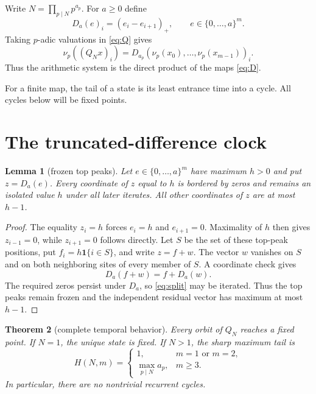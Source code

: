 \documentclass[a4paper,11pt]{amsart}
\newtheorem{theorem}{Theorem}[section]
\newtheorem{lemma}[theorem]{Lemma}
\theoremstyle{remark}
\begin{document}
Write $N=\prod_{p\mid N}p^{a_p}$.  For $a\geq0$ define
\begin{equation}\label{eq:D}
 D_a(e)_i=(e_i-e_{i+1})_+,
 \qquad e\in\{0,\ldots,a\}^m.
\end{equation}
Taking $p$-adic valuations in \eqref{eq:Q} gives
\begin{equation}\label{eq:conjugacy}
 \nu_p((Q_Nx)_i)=D_{a_p}(\nu_p(x_0),\ldots,\nu_p(x_{m-1}))_i.
\end{equation}
Thus the arithmetic system is the direct product of the maps \eqref{eq:D}.

For a finite map, the tail of a state is its least entrance time into a
cycle.  All cycles below will be fixed points.

\section{The truncated-difference clock}

\begin{lemma}[frozen top peaks]\label{lem:peaks}
Let $e\in\{0,\ldots,a\}^m$ have maximum $h>0$ and put $z=D_a(e)$.
Every coordinate of $z$ equal to $h$ is bordered by zeros and remains an
isolated value $h$ under all later iterates.  All other coordinates of $z$
are at most $h-1$.
\end{lemma}

\begin{proof}
The equality $z_i=h$ forces $e_i=h$ and $e_{i+1}=0$.  Maximality of $h$
then gives $z_{i-1}=0$, while $z_{i+1}=0$ follows directly.  Let $S$ be the
set of these top-peak positions, put $f_i=h\mathbf1\{i\in S\}$, and write
$z=f+w$.  The vector $w$ vanishes on $S$ and on both neighboring sites of
every member of $S$.  A coordinate check gives
\begin{equation}\label{eq:split}
 D_a(f+w)=f+D_a(w).
\end{equation}
The required zeros persist under $D_a$, so \eqref{eq:split} may be iterated.
Thus the top peaks remain frozen and the independent residual vector has
maximum at most $h-1$.
\end{proof}

\begin{theorem}[complete temporal behavior]\label{thm:clock}
Every orbit of $Q_N$ reaches a fixed point.  If $N=1$, the unique state is
fixed.  If $N>1$, the sharp maximum tail is
\begin{equation}\label{eq:height}
 H(N,m)=
 \begin{cases}
 1,&m=1\text{ or }m=2,\\
 \max_{p\mid N}a_p,&m\geq3.
 \end{cases}
\end{equation}
In particular, there are no nontrivial recurrent cycles.
\end{theorem}
\end{document}
